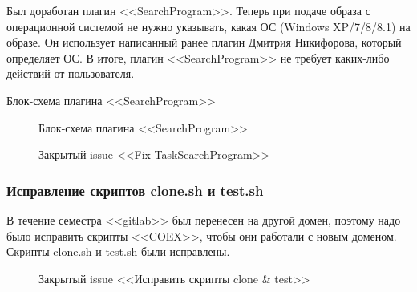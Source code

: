 Был доработан плагин <<SearchProgram>>. Теперь при подаче образа с операционной системой не нужно указывать, какая ОС (Windows XP/7/8/8.1) на образе. Он использует написанный ранее плагин Дмитрия Никифорова, который определяет ОС. В итоге, плагин <<SearchProgram>> не требует каких-либо действий от пользователя.

Блок-схема плагина <<SearchProgram>>

\begin{figure}[h!]
\caption{ Блок-схема плагина <<SearchProgram>> }
\label{kucher_1:kucher_1}
\end{figure}

\begin{figure}[h!]
\caption{ Закрытый issue <<Fix TaskSearchProgram>> }
\label{kucher_2:kucher_2}
\end{figure}

\subsubsection{Исправление скриптов clone.sh и test.sh}

	В течение семестра <<gitlab>> был перенесен на другой домен, поэтому надо было исправить скрипты <<COEX>>, чтобы они работали с новым доменом. Скрипты clone.sh и test.sh были исправлены.
	
\begin{figure}[h!]
\caption{ Закрытый issue <<Исправить скрипты clone & test>> }
\label{kucher_3:kucher_3}
\end{figure}
	
